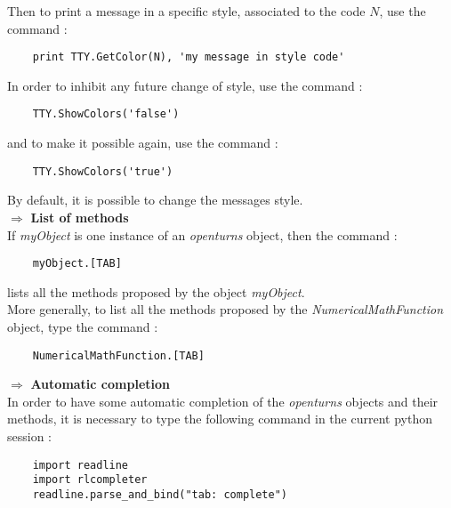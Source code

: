 Then to print a message in a specific style, associated to the code $N$, use the command :
\begin{center}
  \begin{lstlisting}
    print TTY.GetColor(N), 'my message in style code'
  \end{lstlisting}
\end{center}

In order to inhibit any future change of style, use the command :
\begin{center}
  \begin{lstlisting}
    TTY.ShowColors('false')
  \end{lstlisting}
\end{center}
and to make it possible again, use the command :
\begin{center}
  \begin{lstlisting}
    TTY.ShowColors('true')
  \end{lstlisting}
\end{center}
By default, it is possible to change the messages style.\\

$\boldsymbol{\Longrightarrow}$ {\bf List of methods}\\

If {\itshape myObject} is one instance of an {\itshape openturns} object, then the command :
\begin{center}
  \begin{lstlisting}
    myObject.[TAB]
  \end{lstlisting}
\end{center}
lists all the methods proposed by the object {\itshape myObject}.\\

More generally, to list all the methods proposed by the {\itshape NumericalMathFunction} object, type the command :
\begin{center}
  \begin{lstlisting}
    NumericalMathFunction.[TAB]
  \end{lstlisting}
\end{center}


{$\boldsymbol{\Longrightarrow}$ \bf Automatic completion}\\

In order to have some automatic completion of the {\itshape openturns} objects and their methods, it is necessary to type the following command in the current python session :
\begin{center}
  \begin{lstlisting}
    import readline
    import rlcompleter
    readline.parse_and_bind("tab: complete")
  \end{lstlisting}
\end{center}

